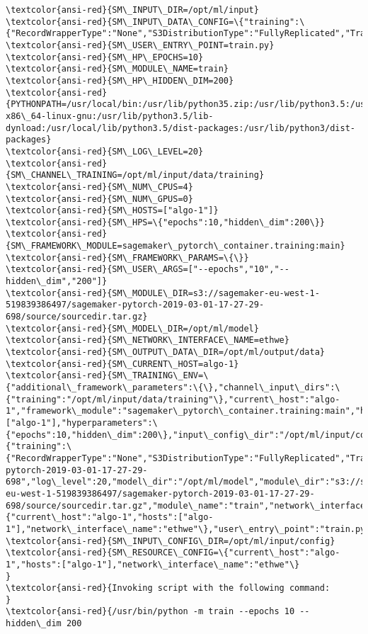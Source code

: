 \documentclass[11pt]{article}
\begin{document}
\begin{Verbatim}[commandchars=\\\{\}]
\textcolor{ansi-red}{SM\_INPUT\_DIR=/opt/ml/input}
\textcolor{ansi-red}{SM\_INPUT\_DATA\_CONFIG=\{"training":\{"RecordWrapperType":"None","S3DistributionType":"FullyReplicated","TrainingInputMode":"File"\}\}}
\textcolor{ansi-red}{SM\_USER\_ENTRY\_POINT=train.py}
\textcolor{ansi-red}{SM\_HP\_EPOCHS=10}
\textcolor{ansi-red}{SM\_MODULE\_NAME=train}
\textcolor{ansi-red}{SM\_HP\_HIDDEN\_DIM=200}
\textcolor{ansi-red}{PYTHONPATH=/usr/local/bin:/usr/lib/python35.zip:/usr/lib/python3.5:/usr/lib/python3.5/plat-x86\_64-linux-gnu:/usr/lib/python3.5/lib-dynload:/usr/local/lib/python3.5/dist-packages:/usr/lib/python3/dist-packages}
\textcolor{ansi-red}{SM\_LOG\_LEVEL=20}
\textcolor{ansi-red}{SM\_CHANNEL\_TRAINING=/opt/ml/input/data/training}
\textcolor{ansi-red}{SM\_NUM\_CPUS=4}
\textcolor{ansi-red}{SM\_NUM\_GPUS=0}
\textcolor{ansi-red}{SM\_HOSTS=["algo-1"]}
\textcolor{ansi-red}{SM\_HPS=\{"epochs":10,"hidden\_dim":200\}}
\textcolor{ansi-red}{SM\_FRAMEWORK\_MODULE=sagemaker\_pytorch\_container.training:main}
\textcolor{ansi-red}{SM\_FRAMEWORK\_PARAMS=\{\}}
\textcolor{ansi-red}{SM\_USER\_ARGS=["--epochs","10","--hidden\_dim","200"]}
\textcolor{ansi-red}{SM\_MODULE\_DIR=s3://sagemaker-eu-west-1-519839386497/sagemaker-pytorch-2019-03-01-17-27-29-698/source/sourcedir.tar.gz}
\textcolor{ansi-red}{SM\_MODEL\_DIR=/opt/ml/model}
\textcolor{ansi-red}{SM\_NETWORK\_INTERFACE\_NAME=ethwe}
\textcolor{ansi-red}{SM\_OUTPUT\_DATA\_DIR=/opt/ml/output/data}
\textcolor{ansi-red}{SM\_CURRENT\_HOST=algo-1}
\textcolor{ansi-red}{SM\_TRAINING\_ENV=\{"additional\_framework\_parameters":\{\},"channel\_input\_dirs":\{"training":"/opt/ml/input/data/training"\},"current\_host":"algo-1","framework\_module":"sagemaker\_pytorch\_container.training:main","hosts":["algo-1"],"hyperparameters":\{"epochs":10,"hidden\_dim":200\},"input\_config\_dir":"/opt/ml/input/config","input\_data\_config":\{"training":\{"RecordWrapperType":"None","S3DistributionType":"FullyReplicated","TrainingInputMode":"File"\}\},"input\_dir":"/opt/ml/input","job\_name":"sagemaker-pytorch-2019-03-01-17-27-29-698","log\_level":20,"model\_dir":"/opt/ml/model","module\_dir":"s3://sagemaker-eu-west-1-519839386497/sagemaker-pytorch-2019-03-01-17-27-29-698/source/sourcedir.tar.gz","module\_name":"train","network\_interface\_name":"ethwe","num\_cpus":4,"num\_gpus":0,"output\_data\_dir":"/opt/ml/output/data","output\_dir":"/opt/ml/output","output\_intermediate\_dir":"/opt/ml/output/intermediate","resource\_config":\{"current\_host":"algo-1","hosts":["algo-1"],"network\_interface\_name":"ethwe"\},"user\_entry\_point":"train.py"\}}
\textcolor{ansi-red}{SM\_INPUT\_CONFIG\_DIR=/opt/ml/input/config}
\textcolor{ansi-red}{SM\_RESOURCE\_CONFIG=\{"current\_host":"algo-1","hosts":["algo-1"],"network\_interface\_name":"ethwe"\}
}
\textcolor{ansi-red}{Invoking script with the following command:
}
\textcolor{ansi-red}{/usr/bin/python -m train --epochs 10 --hidden\_dim 200


\end{Verbatim}
\end{document}
